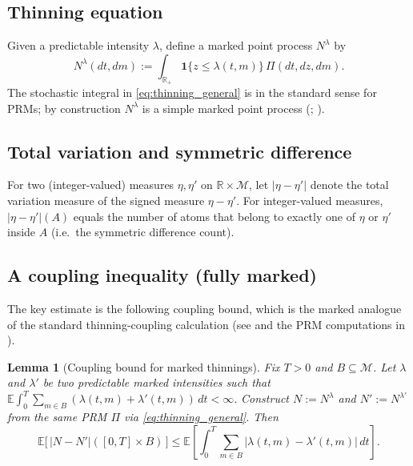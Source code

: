 \documentclass[12pt]{article}
\newtheorem{lemma}[theorem]{Lemma}
\begin{document}
\subsection{Thinning equation}

Given a predictable intensity $\lambda$, define a marked point process $N^\lambda$ by
\begin{equation}
\label{eq:thinning_general}
N^\lambda(dt,dm)
:=
\int_{\mathbb R_+}\mathbf 1\{z\le \lambda(t,m)\}\,\Pi(dt,dz,dm).
\end{equation}
The stochastic integral in \eqref{eq:thinning_general} is in the standard sense for PRMs; by construction $N^\lambda$ is a simple marked point process
(\citep[Ch.~10]{daley2003introduction}; \citep{ogata1981lewis}).

\subsection{Total variation and symmetric difference}

For two (integer-valued) measures $\eta,\eta'$ on $\mathbb R\times\mathcal M$, let $|\eta-\eta'|$ denote the total variation measure of the signed measure $\eta-\eta'$.
For integer-valued measures, $|\eta-\eta'|(A)$ equals the number of atoms that belong to exactly one of $\eta$ or $\eta'$ inside $A$
(i.e.\ the symmetric difference count).

\subsection{A coupling inequality (fully marked)}

The key estimate is the following coupling bound, which is the marked analogue of the standard thinning-coupling calculation
(see \citep{bremaud1996stability} and the PRM computations in \cite[Ch.~10]{daley2003introduction}).

\begin{lemma}[Coupling bound for marked thinnings]
\label{lem:coupling_marked}
Fix $T>0$ and $B\subseteq\mathcal M$.
Let $\lambda$ and $\lambda'$ be two predictable marked intensities such that
\(
\mathbb E\int_0^T\sum_{m\in B}(\lambda(t,m)+\lambda'(t,m))\,dt <\infty.
\)
Construct $N:=N^\lambda$ and $N':=N^{\lambda'}$ from the \emph{same} PRM $\Pi$ via \eqref{eq:thinning_general}.
Then
\begin{equation}
\label{eq:coupling_bound_marked}
\mathbb E\bigl[\,|N-N'|([0,T]\times B)\,\bigr]
\le
\mathbb E\!\left[\int_0^T\sum_{m\in B}\bigl|\lambda(t,m)-\lambda'(t,m)\bigr|\,dt\right].
\end{equation}
\end{lemma}
\end{document}
